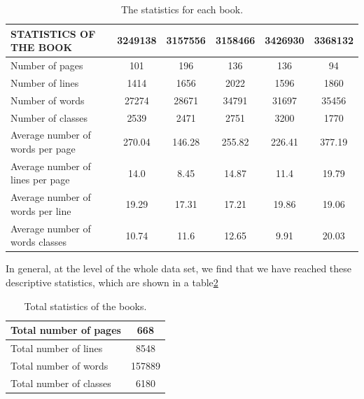 \begin{table}[!htb]
\centering
\begin{tabular}{|l|c|c|c|c|c|}
\hline
STATISTICS OF THE BOOK & 3249138 & 3157556 & 3158466 & 3426930 & 3368132 \\  \hline
Number of pages & 101 & 196 & 136 & 136 & 94 \\ \hline 
Number of lines &  1414  & 1656 & 2022 & 1596 & 1860 \\ \hline 
Number of words & 27274  & 28671 & 34791 & 31697 & 35456 \\ \hline 
Number of classes & 2539 & 2471 & 2751 & 3200 & 1770 \\  \hline 
Average number of words per page & 270.04 & 146.28 & 255.82 & 226.41 & 377.19 \\ \hline 
Average number of lines per page & 14.0 & 8.45 & 14.87 & 11.4 & 19.79 \\ \hline
Average number of words per line & 19.29 & 17.31 & 17.21 & 19.86 & 19.06 \\\hline
Average number of words classes & 10.74 & 11.6 & 12.65 & 9.91 & 20.03\\  \hline
\end{tabular}
\caption{The statistics for each book.}
\label{table:statistics_for_each_book}
\end{table}

\noindent
In general, at the level of the whole data set, we find that we have reached these descriptive statistics, which are shown in a table\ref{table:statistics_for_all_dataset}

\begin{table}[!htb]
\centering
\begin{tabular}{|l|c|}
\hline
Total number of pages & 668 \\ \hline
Total number of lines & 8548 \\ \hline
Total number of words & 157889 \\ \hline
Total number of classes & 6180 \\ \hline
\end{tabular}
\caption{Total statistics of the books.}
\label{table:statistics_for_all_dataset}
\end{table}

\newpage

